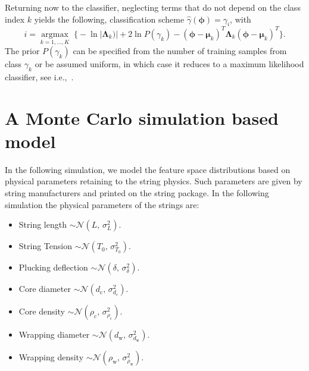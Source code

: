 \documentclass{article}
\begin{document}
\begin{sloppy}
%
Returning now to the classifier, neglecting terms that do not depend on the class index $k$ yields the following, classification scheme $\hat{\gamma}(\boldsymbol{\phi})={\gamma}_i$, with
%
\begin{equation}\label{eq:classifier}
  i=\underset{k=1,\dots,K}{\operatorname{argmax}}\;
\bigg\{ -\ln \lvert \boldsymbol{\Lambda}_k) \rvert + 2 \ln P(\gamma_k) - (\boldsymbol{\phi}-\boldsymbol{\mu}_k)^T \boldsymbol{\Lambda}_k (\boldsymbol{\phi}-\boldsymbol{\mu}_k)^T    %
\bigg\}.
\end{equation}
%
The prior $P(\gamma_k)$ can be specified from the number of training samples from class $\gamma_k$ or be assumed uniform, in which case it reduces to a maximum likelihood classifier, see i.e.,~\cite{mspr}.
%
\section{A Monte Carlo simulation based model}
In the following simulation, we model the feature space distributions based on physical parameters retaining to the string physics. Such parameters are given by string manufacturers and printed on the string package. In the following simulation the physical parameters of the strings are:
\begin{itemize}
    \item String length $\sim \mathcal{N}(L,\,\sigma_{L}^{2})$.
    \item String Tension $\sim \mathcal{N}(T_0,\,\sigma_{T_0}^{2})$.
    \item Plucking deflection $\sim \mathcal{N}(\delta,\,\sigma_{\delta}^{2})$.

    \item Core diameter $\sim \mathcal{N}(d_\text{c},\,\sigma_{d_\text{c}}^{2})$.
    \item Core density $\sim \mathcal{N}(\rho_\text{c},\,\sigma_{\rho_\text{c}}^{2})$.
    \item Wrapping diameter $\sim \mathcal{N}(d_\text{w},\,\sigma_{d_\text{w}}^{2})$.
    \item Wrapping density $\sim \mathcal{N}(\rho_\text{w},\,\sigma_{\rho_\text{w}}^{2})$.

\end{itemize}
%
%
%
%

\end{sloppy}
\end{document}
